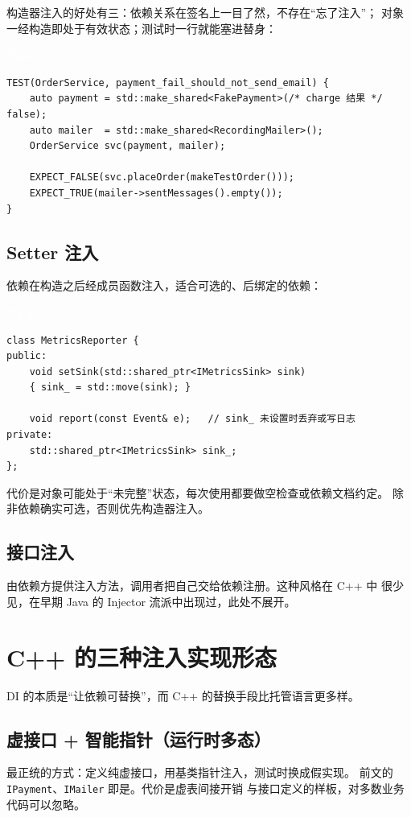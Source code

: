 \documentclass[12pt,a4paper,fontset=fandol]{ctexbook}
\newcommand{\cpplabel}{%
  \begin{tcolorbox}[enhanced,colback=cppheadbg,colframe=cppheadbg,
    arc=1mm,boxrule=0mm,left=6pt,right=6pt,top=2pt,bottom=2pt,
    halign=left,oversize]
    \textcolor{white}{\small\bfseries C++}
  \end{tcolorbox}\vspace{-4pt}}
\begin{document}
构造器注入的好处有三：依赖关系在签名上一目了然，不存在“忘了注入”；
对象一经构造即处于有效状态；测试时一行就能塞进替身：

\cpplabel
\begin{lstlisting}
TEST(OrderService, payment_fail_should_not_send_email) {
    auto payment = std::make_shared<FakePayment>(/* charge 结果 */ false);
    auto mailer  = std::make_shared<RecordingMailer>();
    OrderService svc(payment, mailer);

    EXPECT_FALSE(svc.placeOrder(makeTestOrder()));
    EXPECT_TRUE(mailer->sentMessages().empty());
}
\end{lstlisting}

\subsection{Setter 注入}

依赖在构造之后经成员函数注入，适合可选的、后绑定的依赖：

\cpplabel
\begin{lstlisting}
class MetricsReporter {
public:
    void setSink(std::shared_ptr<IMetricsSink> sink)
    { sink_ = std::move(sink); }

    void report(const Event& e);   // sink_ 未设置时丢弃或写日志
private:
    std::shared_ptr<IMetricsSink> sink_;
};
\end{lstlisting}

代价是对象可能处于“未完整”状态，每次使用都要做空检查或依赖文档约定。
除非依赖确实可选，否则优先构造器注入。

\subsection{接口注入}

由依赖方提供注入方法，调用者把自己交给依赖注册。这种风格在 C++ 中
很少见，在早期 Java 的 Injector 流派中出现过，此处不展开。

\section{C++ 的三种注入实现形态}

DI 的本质是“让依赖可替换”，而 C++ 的替换手段比托管语言更多样。

\subsection{虚接口 + 智能指针（运行时多态）}

最正统的方式：定义纯虚接口，用基类指针注入，测试时换成假实现。
前文的 \texttt{IPayment}、\texttt{IMailer} 即是。代价是虚表间接开销
与接口定义的样板，对多数业务代码可以忽略。
\end{document}
